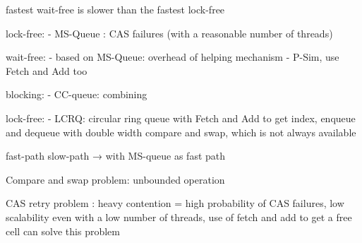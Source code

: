 
















fastest wait-free is slower than the fastest lock-free

lock-free:
 - MS-Queue : CAS failures (with a reasonable number of threads)

wait-free:
- based on MS-Queue: overhead of helping mechanism
- P-Sim, use Fetch and Add too

blocking:
- CC-queue: combining

lock-free:
- LCRQ: circular ring queue with Fetch and Add to get index, enqueue and dequeue
with double width compare and swap, which is not always available

fast-path slow-path → with MS-queue as fast path

Compare and swap problem: unbounded operation


CAS retry problem : heavy contention = high probability of CAS failures, low
scalability even with a low number of threads, use of fetch and add to get a
free cell can solve this problem
